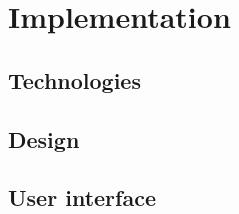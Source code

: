 \chapter{Implementation}
\label{chap:implementation}

\section{Technologies}
\section{Design}
\section{User interface}
